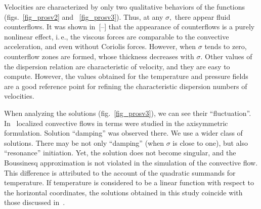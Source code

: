 Velocities are characterized by only two qualitative behaviors of the functions (figs.~\ref{fig_prosv2} and ~\ref{fig_prosv3}). Thus, at any  $\sigma,$ there appear fluid counterflows. It was shown in~[--] that the appearance of counterflows is a purely nonlinear effect, i.\,e., the viscous forces are comparable to the convective acceleration, and even without Coriolis forces. However, when  $\sigma$ tends to zero, counterflow zones are formed, whose thickness decreases with  $\sigma.$ Other values of the dispersion relation are characteristic of velocity, and they are easy to compute. However, the values obtained for the temperature and pressure fields are a good reference point for refining the characteristic dispersion numbers of velocities.





When analyzing the solutions (fig.~\ref{fig_prosv3}), we can see their ``fluctuation''. In~\cite{ulg:bib:Aristov7} localized convective flows in terms were studied in the axisymmetric formulation. Solution ``damping'' was observed there. We use a wider class of solutions. There may be not only ``damping'' (when $\sigma$  is close to one), but also ``resonance'' initiation. Yet, the solution does not become singular, and the Boussinesq approxi\-mation is not violated in the simulation of the convective flow. This difference is attributed to the account of the quadratic summands for temperature. If tempera\-ture is considered to be a linear function with respect to the horizontal coordinates, the solutions obtained in this study coincide with those discussed in~\cite{ulg:bib:Aristov4}.



